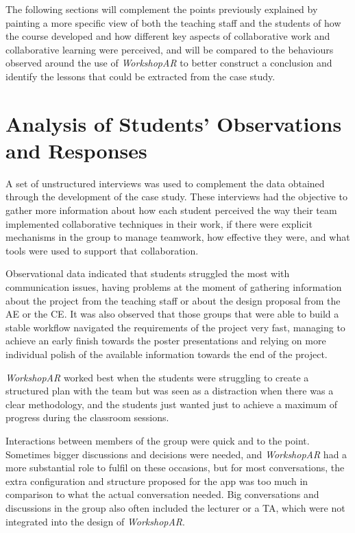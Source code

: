 The following sections will complement the points previously explained by painting a more specific view of both the teaching staff and the students of how the course
developed and how different key aspects of collaborative work and collaborative learning were perceived, and will be compared to the behaviours observed around the use
of \emph{WorkshopAR} to better construct a conclusion and identify the lessons that could be extracted from the case study.

\section{Analysis of Students' Observations and Responses \label{sec:6-9}}

A set of unstructured interviews was used to complement the data obtained through the development of the case study. These interviews had the objective to gather more
information about how each student perceived the way their team implemented collaborative techniques in their work, if there were explicit mechanisms in the group to
manage teamwork, how effective they were, and what tools were used to support that collaboration.

Observational data indicated that students struggled the most with communication issues, having problems at the moment of gathering information about the project from the
teaching staff or about the design proposal from the \ac{AE} or the \ac{CE}. It was also observed that those groups that were able to build a stable workflow navigated
the requirements of the project very fast, managing to achieve an early finish towards the poster presentations and relying on more individual polish of the available
information towards the end of the project.

\emph{WorkshopAR} worked best when the students were struggling to create a structured plan with the team but was seen as a distraction when there was a clear methodology,
and the students just wanted just to achieve a maximum of progress during the classroom sessions.

Interactions between members of the group were quick and to the point. Sometimes bigger discussions and decisions were needed, and \emph{WorkshopAR} had a more substantial role
to fulfil on these occasions, but for most conversations, the extra configuration and structure proposed for the app was too much in comparison to what the actual
conversation needed. Big conversations and discussions in the group also often included the lecturer or a \ac{TA}, which were not integrated into the design of \emph{WorkshopAR}.

